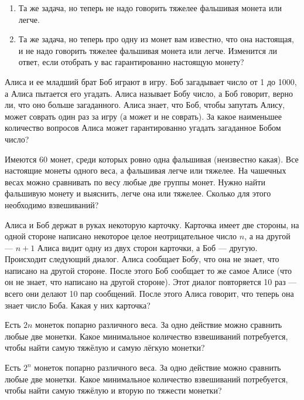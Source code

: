\documentclass{article}
\begin{document}
\begin{enumerate_boxed}
\begin{enumerate}
            \item Та же задача, но теперь не надо говорить тяжелее фальшивая монета или легче.

            \item Та же задача, но теперь про одну из монет вам известно, что она настоящая, и не надо говорить тяжелее фальшивая монета или легче.
            Изменится ли ответ, если отобрать у вас гарантированно настоящую монету?

        \end{enumerate}


        \item Алиса и ее младший брат Боб играют в игру.
        Боб загадывает число от 1 до 1000, а Алиса пытается его угадать.
        Алиса называет Бобу число, а Боб говорит, верно ли, что оно больше загаданного.
        Алиса знает, что Боб, чтобы запутать Алису, может соврать один раз за игру (а может и не соврать).
        За какое наименьшее количество вопросов Алиса может гарантированно угадать загаданное Бобом число?

        \item Имеются 60 монет, среди которых ровно одна фальшивая (неизвестно какая).
        Все настоящие монеты одного веса, а фальшивая легче или тяжелее.
        На чашечных весах можно сравнивать по весу любые две группы монет.
        Нужно найти фальшивую монету и выяснить, легче она или тяжелее.
        Сколько для этого необходимо взвешиваний?

        \item Алиса и Боб держат в руках некоторую карточку.
        Карточка имеет две стороны, на одной стороне написано некоторое целое неотрицательное число $n$, а на другой — $n + 1$ Алиса видит одну из двух сторон карточки, а Боб — другую.
        Происходит следующий диалог.
        Алиса сообщает Бобу, что она не знает, что написано на другой стороне.
        После этого Боб сообщает то же самое Алисе (что он не знает, что написано на другой стороне).
        Этот диалог повторяется 10 раз — всего они делают 10 пар сообщений.
        После этого Алиса говорит, что теперь она знает число Боба.
        Какая у них карточка?

        \item Есть $2n$ монеток попарно различного веса.
        За одно действие можно сравнить любые две монетки.
        Какое минимальное количество взвешиваний потребуется, чтобы найти самую тяжёлую и самую лёгкую монетки?

        \item Есть $2^n$ монеток попарно различного веса.
        За одно действие можно сравнить любые две монетки.
        Какое минимальное количество взвешиваний потребуется, чтобы найти самую тяжёлую и вторую по тяжести монетки?


\end{enumerate_boxed}
\end{document}
